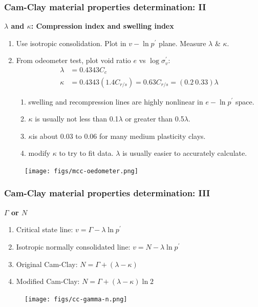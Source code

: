 \documentclass[notes]{beamer}
\begin{document}
\begin{frame}
\frametitle{Cam-Clay material properties determination: II}
\textbf{$\lambda$ and $\kappa$: Compression index and swelling index}
\begin{enumerate}
	\item Use isotropic consolidation. Plot in $v-\ln p^\prime$ plane. Measure $\lambda$ \& $\kappa$.
	\item From odeometer test, plot void ratio $e$ vs $\log \sigma_v^\prime$:
		\begin{align*}
			\lambda & = 0.4343 C_c \\
			\kappa & = 0.4343 (1.4 C_{r/s}) = 0.63 C_{r/s} = (0.2 ~ 0.33) \lambda
		\end{align*}
		\begin{enumerate}
			\item swelling and recompression lines are highly nonlinear in $e-\ln p^\prime$ space.
			\item  $\kappa$ is usually not less than 0.1$\lambda$ or greater than 0.5$\lambda$.
			\item $\kappa$is about 0.03 to 0.06 for many medium plasticity clays.
			\item  modify $\kappa$ to try to fit data. $\lambda$ is usually easier to accurately calculate.
		\end{enumerate}
\end{enumerate}
	
	\begin{figure}
		\texttt{[image: figs/mcc-oedometer.png]}
	\end{figure}
\end{frame}

\begin{frame}
\frametitle{Cam-Clay material properties determination: III}
\textbf{$\Gamma$ or $N$}
\begin{enumerate}
	\item Critical state line: $v = \Gamma - \lambda \ln p^\prime$
	\item Isotropic normally consolidated line: $v = N - \lambda \ln p^\prime$
	\item Original Cam-Clay: $N = \Gamma + (\lambda - \kappa)$
	\item Modified Cam-Clay: $N = \Gamma + (\lambda - \kappa) \ln 2$
\end{enumerate}

\begin{figure}
	\texttt{[image: figs/cc-gamma-n.png]}
\end{figure}
\end{frame}
\end{document}
